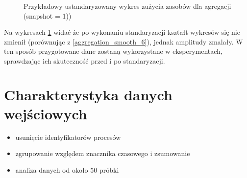 \begin{figure}[H]
  \centering
  \hfill
  \caption{Przykładowy ustandaryzowany wykres zużycia zasobów dla agregacji (snapshot = 1))}
  \label{aggregation_standardised}
\end{figure}

Na wykresach \ref{aggregation_standardised} widać że po wykonaniu standaryzacji kształt wykresów się nie zmienił (porównując z \ref{aggregation_smooth_6}), jednak amplitudy zmalały. W ten sposób przygotowane dane zostaną wykorzystane w eksperymentach, sprawdzając ich skuteczność przed i po standaryzacji.

\section{Charakterystyka danych wejściowych}
\begin{itemize}
    \item usunięcie identyfikatorów procesów
    \item zgrupowanie względem znacznika czasowego i zsumowanie
    \item analiza danych od około 50 próbki
\end{itemize}
